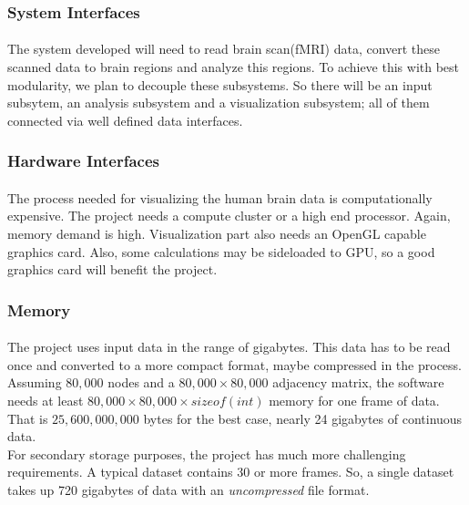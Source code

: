 \documentclass[paper=a4, fontsize=12pt]{scrartcl}	%
\numberwithin{equation}{section}		%
\numberwithin{figure}{section}			%
\numberwithin{table}{section}				%
\begin{document}
	\subsubsection{System Interfaces}
    \paragraph{}
    The system developed will need to read brain scan(fMRI) data, convert these scanned data to brain regions and analyze this regions. To achieve this with best modularity, we plan to decouple these subsystems. So there will be an input subsytem, an analysis subsystem and a visualization subsystem; all of them connected  via well defined data interfaces.\\
   
	\subsubsection{Hardware Interfaces}
    \paragraph{}
    The process needed for visualizing the human brain data is computationally expensive. The project needs a compute cluster or a high end processor. Again, memory demand is high. Visualization part also needs an OpenGL capable graphics card. Also, some calculations may be sideloaded to GPU, so a good graphics card will benefit the project.\\
    
    
	\subsubsection{Memory}
    \paragraph{}
    The project uses input data in the range of gigabytes. This data has to be read once and converted to a more compact format, maybe compressed in the process.\\
    
    Assuming $80,000$ nodes and a $80,000\times80,000$ adjacency matrix, the software needs at least $80,000\times80,000\times sizeof(int)$ memory for one frame of data. That is $25,600,000,000$ bytes for the best case, nearly 24 gigabytes of continuous data.\\
    
    For secondary storage purposes, the project has much more challenging requirements. A typical dataset contains 30 or more frames. So, a single dataset takes up 720 gigabytes of data with an {\em uncompressed} file format.\\
\end{document}
